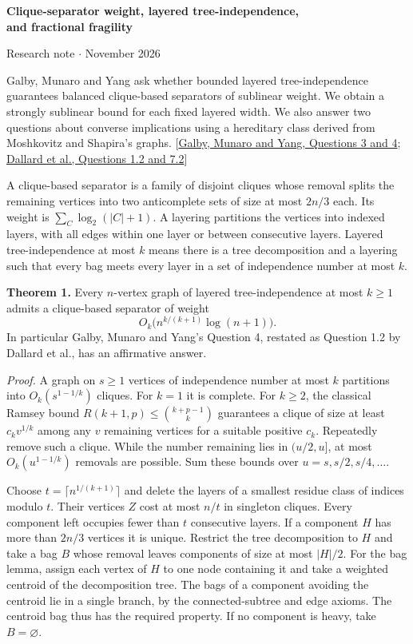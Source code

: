 \documentclass[11pt]{article}
\begin{document}
\begin{center}{\Large\bfseries Clique-separator weight, layered tree-independence,\\ and fractional fragility}\par
\small Research note \enspace$\cdot$ November 2026\end{center}

Galby, Munaro and Yang ask whether bounded layered tree-independence guarantees balanced clique-based separators of sublinear weight. We obtain a strongly sublinear bound for each fixed layered width. We also answer two questions about converse implications using a hereditary class derived from Moshkovitz and Shapira's graphs. [\href{https://arxiv.org/abs/2402.18352}{Galby, Munaro and Yang, Questions 3 and 4}; \href{https://arxiv.org/abs/2506.12424}{Dallard et al., Questions 1.2 and 7.2}]

A clique-based separator is a family of disjoint cliques whose removal splits the remaining vertices into two anticomplete sets of size at most $2n/3$ each. Its weight is $\sum_C\log_2(|C|+1)$. A layering partitions the vertices into indexed layers, with all edges within one layer or between consecutive layers. Layered tree-independence at most $k$ means there is a tree decomposition and a layering such that every bag meets every layer in a set of independence number at most $k$.

\textbf{Theorem 1.} Every $n$-vertex graph of layered tree-independence at most $k\ge1$ admits a clique-based separator of weight
\[
                    O_k\big(n^{k/(k+1)}\log(n+1)\big).
\]
In particular Galby, Munaro and Yang's Question 4, restated as Question 1.2 by Dallard et al., has an affirmative answer.

\textit{Proof.} A graph on $s\ge1$ vertices of independence number at most $k$ partitions into $O_k(s^{1-1/k})$ cliques. For $k=1$ it is complete. For $k\ge2$, the classical Ramsey bound $R(k+1,p)\le\binom{k+p-1}{k}$ guarantees a clique of size at least $c_k v^{1/k}$ among any $v$ remaining vertices for a suitable positive $c_k$. Repeatedly remove such a clique. While the number remaining lies in $(u/2,u]$, at most $O_k(u^{1-1/k})$ removals are possible. Sum these bounds over $u=s,s/2,s/4,\ldots$.

Choose $t=\lceil n^{1/(k+1)}\rceil$ and delete the layers of a smallest residue class of indices modulo $t$. Their vertices $Z$ cost at most $n/t$ in singleton cliques. Every component left occupies fewer than $t$ consecutive layers. If a component $H$ has more than $2n/3$ vertices it is unique. Restrict the tree decomposition to $H$ and take a bag $B$ whose removal leaves components of size at most $|H|/2$. For the bag lemma, assign each vertex of $H$ to one node containing it and take a weighted centroid of the decomposition tree. The bags of a component avoiding the centroid lie in a single branch, by the connected-subtree and edge axioms. The centroid bag thus has the required property. If no component is heavy, take $B=\varnothing$.
\end{document}

